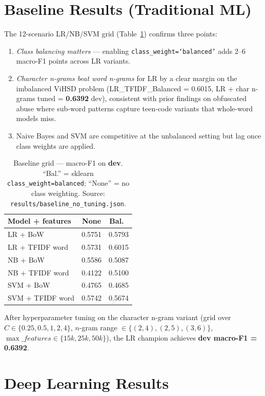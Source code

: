 \documentclass[a4paper,12pt,oneside]{report}
\begin{document}
\section{Baseline Results (Traditional ML)}
\label{sec:lr-results}
The 12-scenario LR/NB/SVM grid (Table~\ref{tab:baseline}) confirms three
points:

\begin{enumerate}
  \item \emph{Class balancing matters} --- enabling
        \texttt{class\_weight=`balanced'} adds 2--6 macro-F1 points
        across LR variants.
  \item \emph{Character n-grams beat word n-grams} for LR by a clear
        margin on the imbalanced ViHSD problem (LR\_TFIDF\_Balanced
        = 0.6015, LR + char n-grams tuned = \textbf{0.6392} dev),
        consistent with prior findings on obfuscated abuse where
        sub-word patterns capture teen-code variants that whole-word
        models miss.
  \item Naive Bayes and SVM are competitive at the unbalanced setting
        but lag once class weights are applied.
\end{enumerate}

\begin{table}[H]
\centering
\caption{Baseline grid --- macro-F1 on \textbf{dev}. ``Bal.'' = sklearn
\texttt{class\_weight=balanced}; ``None'' = no class weighting. Source:
\texttt{results/baseline\_no\_tuning.json}.}
\label{tab:baseline}
\begin{tabular}{lcc}
\toprule
Model + features & None & Bal.\ \\ \midrule
LR + BoW         & 0.5751 & 0.5793 \\
LR + TFIDF word  & 0.5731 & 0.6015 \\
NB + BoW         & 0.5586 & 0.5087 \\
NB + TFIDF word  & 0.4122 & 0.5100 \\
SVM + BoW        & 0.4765 & 0.4685 \\
SVM + TFIDF word & 0.5742 & 0.5674 \\ \bottomrule
\end{tabular}
\end{table}

After hyperparameter tuning on the character n-gram variant
(grid over $C \in \{0.25, 0.5, 1, 2, 4\}$, $n$-gram range $\in
\{(2,4), (2,5), (3,6)\}$, $\max\_features \in \{15k, 25k, 50k\}$), the LR
champion achieves \textbf{dev macro-F1 = 0.6392}.

\section{Deep Learning Results}
\label{sec:dl-results}
\end{document}
